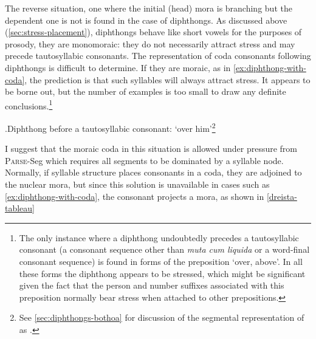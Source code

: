 The reverse situation, \ie one where the initial (head) mora is branching but the dependent one is not is found in the case of diphthongs. As discussed above (\cref{sec:stress-placement}), diphthongs behave like short vowels for the purposes of prosody, \ie they are monomoraic: they do not necessarily attract stress and may precede tautosyllabic consonants. The representation of coda consonants following diphthongs is difficult to determine. If they are moraic, as in \cref{ex:diphthong-with-coda}, the prediction is that such syllables will always attract stress. It appears to be borne out, but the number of examples is too small to draw any definite conclusions.\footnote{The only instance where a diphthong undoubtedly precedes a tautosyllabic consonant (\ie a consonant sequence other than \emph{muta cum liquida} or a word-final consonant sequence) is found in forms of the preposition \ipa{[ˈdrɛĭst]} `over, above'. In all these forms the diphthong appears to be stressed, which might be significant given the fact that the person and number suffixes associated with this preposition normally bear stress when attached to other prepositions.}

\ex.\label{ex:diphthong-with-coda}Diphthong before a tautosyllabic consonant: \ipa{[ˈdrɛĭstã]} `over him'\footnote{See \cref{sec:diphthongs-bothoa} for discussion of the segmental representation of \ipa{[ɛĭ]} as \ipa{[əi]}.}\\

I suggest that the moraic coda in this situation is allowed under pressure from \textsc{Parse}-Seg which requires all segments to be dominated by a syllable node. Normally, if syllable structure places consonants in a coda, they are adjoined to the nuclear mora, but since this solution is unavailable in cases such as \ref{ex:diphthong-with-coda}, the consonant projects a mora, as shown in \ref{dreista-tableau}

